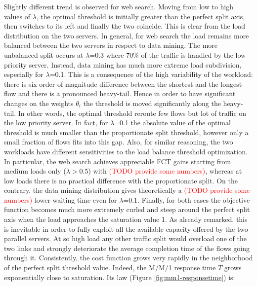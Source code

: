 Slightly different trend is observed for web search. Moving from low to high values of $\lambda$, the optimal threshold is initially greater than the perfect split axis, then switches to its left and finally the two coincide. This is clear from the load distribution on the two servers. In general, for web search the load remains more balanced between the two servers in respect to data mining. The more unbalanced split occurs at $\lambda$=0.3 where 70\% of the traffic is handled by the low priority server. Instead, data mining has much more extreme load subdivision, especially for $\lambda$=0.1. This is a consequence of the high variability of the workload: there is six order of magnitude difference between the shortest and the longest flow and there is a pronounced heavy-tail. Hence in order to have significant changes on the weights $\theta_i$ the threshold is moved significantly along the heavy-tail. In other words, the optimal threshold reroute few flows but lot of traffic on the low priority server. In fact, for $\lambda$=0.1 the absolute value of the optimal threshold is much smaller than the proportionate split threshold, however only a small fraction of flows fits into this gap. Also, for similar reasoning, the two workloads have different sensitivities to the load balance threshold optimization. In particular, the web search achieves appreciable FCT gains starting from medium loads only ($\lambda > 0.5$) with \textcolor{red}{(TODO provide some numbers)}, whereas at low loads there is no practical difference with the proportionate split. On the contrary, the data mining distribution gives theoretically a \textcolor{red}{(TODO provide some numbers)} lower waiting time even for $\lambda$=0.1. %
Finally, for both cases the objective function becomes much more extremely curled and steep around the perfect split axis when the load approaches the saturation value 1.  As already remarked, this is inevitable in order to fully exploit all the available capacity offered by the two parallel servers. At so high load any other traffic split would overload one of the two links and strongly deteriorate the average completion time of the flows going through it. Consistently, the cost function grows very rapidly in the neighborhood of the perfect split threshold value. Indeed, the M/M/1 response time $T$ grows exponentially close to saturation. Its law (Figure \ref{fig:mm1-responsetime}) is:
